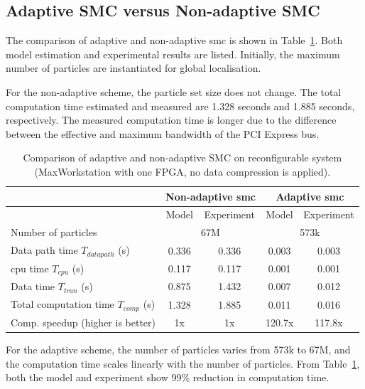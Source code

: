 \subsection{Adaptive SMC versus Non-adaptive SMC}
The comparison of adaptive and non-adaptive \gls{smc} is shown in Table~\ref{tab:smc}.
Both model estimation and experimental results are listed.
Initially, the maximum number of particles are instantiated for global localisation.

For the non-adaptive scheme, the particle set size does not change.
The total computation time estimated and measured are 1.328 seconds and 1.885 seconds, respectively.
The measured computation time is longer due to the difference between the effective and maximum bandwidth of the PCI Express bus.

\begin{table}[ht]
	\centering
	\setlength{\tabcolsep}{5pt}
	\begin{spacing}{1.0}
	\caption[Comparison of adaptive and non-adaptive SMC on reconfigurable system.]{Comparison of adaptive and non-adaptive SMC on reconfigurable system (MaxWorkstation with one FPGA, no data compression is applied).}
	\label{tab:smc}{
	\smallskip
		\begin{tabular}{l || c c | c c}
			\hline
			 \multirow{2}{*}{}  & \multicolumn{2}{c|}{Non-adaptive \gls{smc}} & \multicolumn{2}{c}{Adaptive \gls{smc}} \\
			\hline
			  & Model & Experiment & Model & Experiment \\
			\hline
			\hline
			 Number of particles & \multicolumn{2}{c|}{67M} & \multicolumn{2}{c}{573k} \\
			\hline
			 Data path time $T_{datapath}$ (s) 		& 0.336 & 0.336 & 0.003 & 0.003 \\
			 \gls{cpu} time $T_{cpu}$ (s) 				& 0.117 & 0.117 & 0.001 & 0.001 \\
			 Data time $T_{tran}$ (s) 				& 0.875 & 1.432 & 0.007 & 0.012 \\
			 Total computation time $T_{comp}$ (s)			& 1.328 & 1.885 & 0.011	& 0.016 \\
			\hline
			 Comp. speedup (higher is better)		& 1x	& 1x	& 120.7x	& 117.8x \\
			\hline
		\end{tabular}
	}
	\end{spacing}
\end{table}

For the adaptive scheme, the number of particles varies from 573k to 67M, and the computation time scales linearly with the number of particles.
From Table~\ref{tab:smc}, both the model and experiment show 99\% reduction in computation time.

